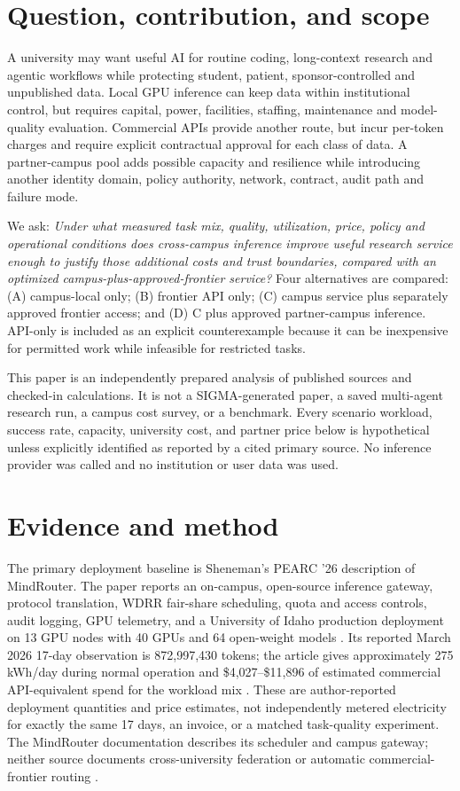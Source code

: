 \section{Question, contribution, and scope}
A university may want useful AI for routine coding, long-context research and agentic workflows while protecting student, patient, sponsor-controlled and unpublished data. Local GPU inference can keep data within institutional control, but requires capital, power, facilities, staffing, maintenance and model-quality evaluation. Commercial APIs provide another route, but incur per-token charges and require explicit contractual approval for each class of data. A partner-campus pool adds possible capacity and resilience while introducing another identity domain, policy authority, network, contract, audit path and failure mode.

We ask: \emph{Under what measured task mix, quality, utilization, price, policy and operational conditions does cross-campus inference improve useful research service enough to justify those additional costs and trust boundaries, compared with an optimized campus-plus-approved-frontier service?} Four alternatives are compared: (A) campus-local only; (B) frontier API only; (C) campus service plus separately approved frontier access; and (D) C plus approved partner-campus inference. API-only is included as an explicit counterexample because it can be inexpensive for permitted work while infeasible for restricted tasks.

This paper is an independently prepared analysis of published sources and checked-in calculations. It is not a SIGMA-generated paper, a saved multi-agent research run, a campus cost survey, or a benchmark. Every scenario workload, success rate, capacity, university cost, and partner price below is hypothetical unless explicitly identified as reported by a cited primary source. No inference provider was called and no institution or user data was used.

\section{Evidence and method}
The primary deployment baseline is Sheneman's PEARC '26 description of MindRouter. The paper reports an on-campus, open-source inference gateway, protocol translation, WDRR fair-share scheduling, quota and access controls, audit logging, GPU telemetry, and a University of Idaho production deployment on 13 GPU nodes with 40 GPUs and 64 open-weight models \cite{sheneman2026}. Its reported March 2026 17-day observation is 872,997,430 tokens; the article gives approximately 275 kWh/day during normal operation and \$4,027--\$11,896 of estimated commercial API-equivalent spend for the workload mix \cite[Sec.~4]{sheneman2026}. These are author-reported deployment quantities and price estimates, not independently metered electricity for exactly the same 17 days, an invoice, or a matched task-quality experiment. The MindRouter documentation describes its scheduler and campus gateway; neither source documents cross-university federation or automatic commercial-frontier routing \cite{mindrouterdocs}.

